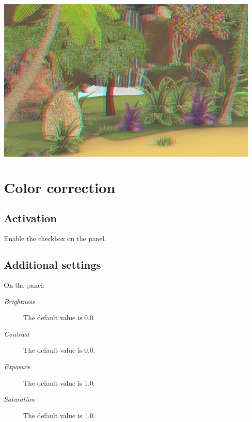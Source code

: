 \documentclass[a4paper,12pt,oneside]{sphinxmanual}
\begin{document}
{\hfill\includegraphics[width=1.000\linewidth]{anaglyph.jpg}\hfill}

\begin{DUlineblock}{0em}
\item[] 
\end{DUlineblock}


\section{Color correction}
\label{postprocessing_effects:index-6}\label{postprocessing_effects:id23}\label{postprocessing_effects:color-correction}

\subsection{Activation}
\label{postprocessing_effects:id24}
Enable the  checkbox on the  panel.


\subsection{Additional settings}
\label{postprocessing_effects:id25}
On the  panel:
\begin{description}
\item[{\emph{Brightness}}] \leavevmode
The default value is 0.0.

\item[{\emph{Contrast}}] \leavevmode
The default value is 0.0.

\item[{\emph{Exposure}}] \leavevmode
The default value is 1.0.

\item[{\emph{Saturation}}] \leavevmode
The default value is 1.0.

\end{description}
\end{document}

